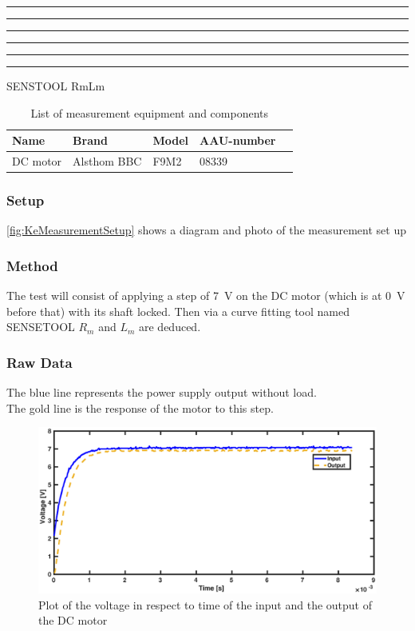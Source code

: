 \hrule

\hrule

\hrule

\hrule

\hrule

\hrule

SENSTOOL RmLm\\

\begin{table}[htbp]
	\centering
	\caption{List of measurement equipment and components}\label{tab_appendix:LaSetUp}
	
	\begin{tabularx}{\textwidth}{lXXXX}
		Name 				& Brand	& Model & AAU-number									\\ \toprule \rowcolor{lightGrey}
		
		DC motor & Alsthom BBC & F9M2 & 08339 
	\end{tabularx}
\end{table}


\subsubsection*{Setup}
\autoref{fig:KeMeasurementSetup} shows a diagram and photo of the measurement set up

\subsubsection*{Method}
The test will consist of applying a step of \SI{7}{\volt} on the DC motor (which is at \SI{0}{\volt} before that) with its shaft locked. Then via a curve fitting tool named SENSETOOL $R_m$ and $L_m$ are deduced.

\subsubsection*{Raw Data}
The blue line represents the power supply output without load.\\
The gold line is the response of the motor to this step.
\begin{figure}[htbp]
	\centering
	\includegraphics[width=\textwidth]{figures/appendix/Motor&GearTests/RmLmDataPlot}
	\caption{Plot of the voltage in respect to time of the input and the output of the DC motor}\label{fig:RmLmTestDataPlot}
\end{figure}


